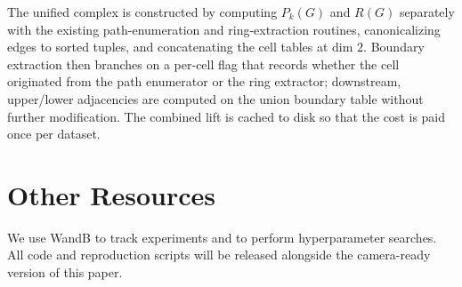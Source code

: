 \documentclass[letterpaper]{article} %
\begin{document}
The unified complex is constructed by computing \(P_k(G)\) and \(R(G)\) separately with the existing path-enumeration and ring-extraction routines, canonicalizing edges to sorted tuples, and concatenating the cell tables at dim \(2\). Boundary extraction then branches on a per-cell flag that records whether the cell originated from the path enumerator or the ring extractor; downstream, upper/lower adjacencies are computed on the union boundary table without further modification. The combined lift is cached to disk so that the cost is paid once per dataset.

\section{Other Resources} \label{app:resources}
We use WandB \cite{wandb} to track experiments and to perform hyperparameter searches. All code and reproduction scripts will be released alongside the camera-ready version of this paper.
\end{document}
